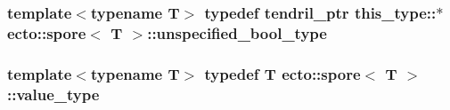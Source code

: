 \hypertarget{structecto_1_1spore_a162474193fb3865f81f8b49b74858aa3}{
\subsubsection[{unspecified\-\_\-bool\-\_\-type}]{\setlength{\rightskip}{0pt plus 5cm}template$<$typename \-T$>$ typedef {\bf tendril\-\_\-ptr} this\-\_\-type\-::$\ast$ {\bf ecto\-::spore}$<$ \-T $>$\-::{\bf unspecified\-\_\-bool\-\_\-type}}}\label{structecto_1_1spore_a162474193fb3865f81f8b49b74858aa3}
\hypertarget{structecto_1_1spore_af36d72731a0e1b823de1b411c34b1a1c}{
\subsubsection[{value\-\_\-type}]{\setlength{\rightskip}{0pt plus 5cm}template$<$typename \-T$>$ typedef \-T {\bf ecto\-::spore}$<$ \-T $>$\-::{\bf value\-\_\-type}}}\label{structecto_1_1spore_af36d72731a0e1b823de1b411c34b1a1c}


